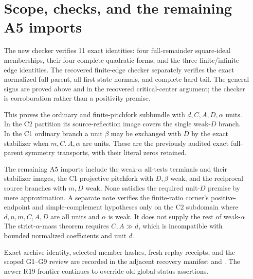 \section*{Scope, checks, and the remaining A5 imports}

The new checker  verifies 11 exact
identities: four full-remainder square-ideal memberships, their four
complete quadratic forms, and the three finite/infinite edge identities.
The recovered finite-edge checker separately verifies the exact
normalized full parent, all first state normals, and complete hard tail.
The general signs are proved above and in the recovered critical-center
argument; the checker is corroboration rather than a positivity premise.

This proves the ordinary and finite-pitchfork subbundle with
$d,C,A,D,\alpha$ units. In the C2 partition its source-reflection
image covers the single weak-$D$ branch. In the C1 ordinary branch a
unit $\beta$ may be exchanged with $D$ by the exact stabilizer when
$m,C,A,\alpha$ are units. These are the previously audited exact
full-parent symmetry transports, with their literal zeros retained.

The remaining A5 imports include the weak-$\alpha$ all-tests terminals and
their stabilizer images, the C1 projective pitchfork with $D,\beta$
weak, and the reciprocal source branches with $m,D$ weak. None satisfies
the required unit-$D$ premise by mere approximation. A separate note
 verifies the finite-ratio corner's
positive-endpoint and simple-complement hypotheses only on the C2
subdomain where $d,n,m,C,A,D$ are all units and $\alpha$ is weak.
It does not supply the rest of weak-$\alpha$.
The strict-$\alpha$-mass theorem requires $C,A\gg d$, which is
incompatible with bounded normalized coefficients and unit $d$.

Exact archive identity, selected member hashes, fresh replay receipts,
and the scoped G1--G9 review are recorded in the adjacent recovery
manifest and . The newer R19 frontier
continues to override old global-status assertions.
